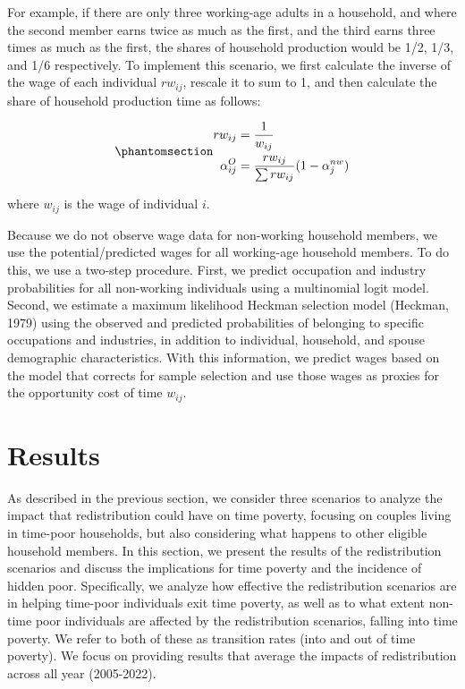 \documentclass[
  11pt,
]{article}
\begin{document}
For example, if there are only three working-age adults in a household,
and where the second member earns twice as much as the first, and the
third earns three times as much as the first, the shares of household
production would be 1/2, 1/3, and 1/6 respectively. To implement this
scenario, we first calculate the inverse of the wage of each individual
\(rw_{ij}\), rescale it to sum to 1, and then calculate the share of
household production time as follows:

\begin{equation}\phantomsection\label{eq-r3}{\begin{aligned}
rw_{ij} &= \frac{1}{w_{ij}} \\
\alpha_{ij}^O &= \frac{rw_{ij}}{\sum rw_{ij}} (1-\alpha_{j}^{nw})
\end{aligned}
}\end{equation}

where \(w_{ij}\) is the wage of individual \(i\).

Because we do not observe wage data for non-working household members,
we use the potential/predicted wages for all working-age household
members. To do this, we use a two-step procedure. First, we predict
occupation and industry probabilities for all non-working individuals
using a multinomial logit model. Second, we estimate a maximum
likelihood Heckman selection model (Heckman, 1979) using the observed
and predicted probabilities of belonging to specific occupations and
industries, in addition to individual, household, and spouse demographic
characteristics. With this information, we predict wages based on the
model that corrects for sample selection and use those wages as proxies
for the opportunity cost of time \(w_{ij}\).

\section{Results}\label{results}

As described in the previous section, we consider three scenarios to
analyze the impact that redistribution could have on time poverty,
focusing on couples living in time-poor households, but also considering
what happens to other eligible household members. In this section, we
present the results of the redistribution scenarios and discuss the
implications for time poverty and the incidence of hidden poor.
Specifically, we analyze how effective the redistribution scenarios are
in helping time-poor individuals exit time poverty, as well as to what
extent non-time poor individuals are affected by the redistribution
scenarios, falling into time poverty. We refer to both of these as
transition rates (into and out of time poverty). We focus on providing
results that average the impacts of redistribution across all year
(2005-2022).
\end{document}
